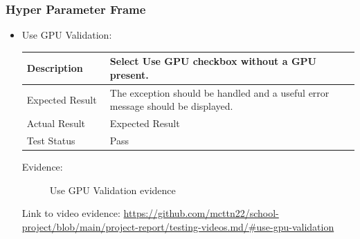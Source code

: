 \documentclass[./project-report/src/latex/project-report.tex]{subfiles}
\begin{document}
\subsubsection{Hyper Parameter Frame}
\label{sec:hyper-parameter-frame-input-validation}
\begin{itemize}
	\item Use GPU Validation: \newline\newline
		\begin{tabular}{|p{0.25\linewidth}|p{0.75\linewidth}|}
			\hline
			Description & Select Use GPU checkbox without a GPU present. \\
			\hline
			Expected Result & The exception should be handled and a useful error message should be displayed. \\
			\hline
			Actual Result & Expected Result \\
			\hline
			Test Status & Pass \\
			\hline
		\end{tabular}

		\vspace{5mm}

		Evidence:
		\begin{figure}[h!]
		\centering
		\caption{Use GPU Validation evidence}
		\end{figure}

		Link to video evidence: \url{https://github.com/mcttn22/school-project/blob/main/project-report/testing-videos.md/#use-gpu-validation}

	\pagebreak


\end{itemize}
\end{document}
